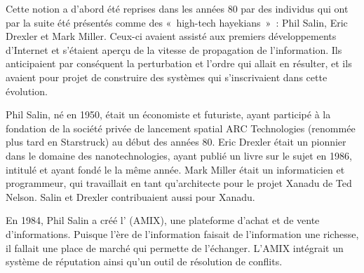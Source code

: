 Cette notion a d'abord été reprises dans les années 80 par des individus qui ont par la suite été présentés comme des «~high-tech hayekians~»~: Phil Salin, Eric Drexler et Mark Miller. Ceux-ci avaient assisté aux premiers développements d'Internet et s'étaient aperçu de la vitesse de propagation de l'information. Ils anticipaient par conséquent la perturbation et l'ordre qui allait en résulter, et ils avaient pour projet de construire des systèmes qui s'inscrivaient dans cette évolution. %

Phil Salin, né en 1950, était un économiste et futuriste, ayant participé à la fondation de la société privée de lancement spatial ARC Technologies (renommée plus tard en Starstruck) au début des années 80. Eric Drexler était un pionnier dans le domaine des nanotechnologies, ayant publié un livre sur le sujet en 1986, intitulé  et ayant fondé le  la même année. Mark Miller était un informaticien et programmeur, qui travaillait en tant qu'architecte pour le projet Xanadu de Ted Nelson. Salin et Drexler contribuaient aussi pour Xanadu. %

En 1984, Phil Salin a créé l' (AMIX), une plateforme d'achat et de vente d'informations. Puisque l'ère de l'information faisait de l'information une richesse, il fallait une place de marché qui permette de l'échanger. L'AMIX intégrait un système de réputation ainsi qu'un outil de résolution de conflits.


